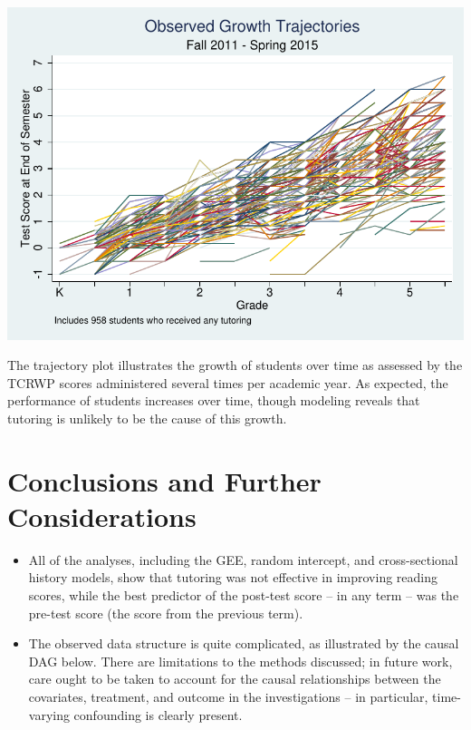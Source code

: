 \documentclass[a0,landscape]{a0poster}
\begin{document}
\begin{multicols}{3}
\begin{center}\vspace{1cm}
\includegraphics[width=0.8\linewidth]{xtline.pdf}
\end{center}\vspace{0.5cm}

The trajectory plot illustrates the growth of students over
time as assessed by the TCRWP scores administered several
times per academic year.
As expected, the performance of students increases over time,
though modeling reveals that tutoring is unlikely to be the
cause of this growth.


\color{SaddleBrown} %

\section*{Conclusions and Further Considerations}

\begin{itemize}
\setlength\itemsep{0.5ex}
\item All of the analyses, including the GEE, random intercept,
and cross-sectional history models, show that tutoring
was not effective in improving reading scores,
while the best predictor of the post-test score
-- in any term -- was the pre-test score
(the score from the previous term).
\item The observed data structure is quite complicated,
as illustrated by the causal DAG below.
There are limitations to the methods discussed;
in future work, care ought to be taken to account for the
causal relationships between the covariates, treatment,
and outcome in the investigations -- in particular,
time-varying confounding is clearly present.
\end{itemize}


\end{multicols}
\end{document}
